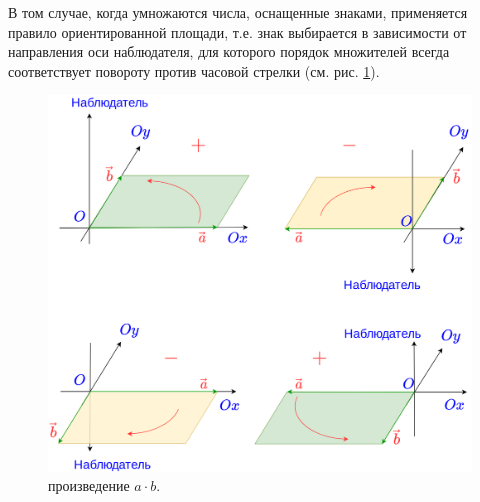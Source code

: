 В том случае, когда умножаются числа, оснащенные знаками, применяется правило ориентированной площади, т.е. знак выбирается в зависимости от направления оси наблюдателя, для которого порядок множителей всегда соответствует повороту против часовой стрелки (см. рис. \ref{mult}).
\begin{figure}[hbt!]
\begin{center}
\includegraphics[scale=0.2]{../mult.png}
\end{center}
\caption{произведение $a\cdot b$.}\label{mult}
\end{figure}


